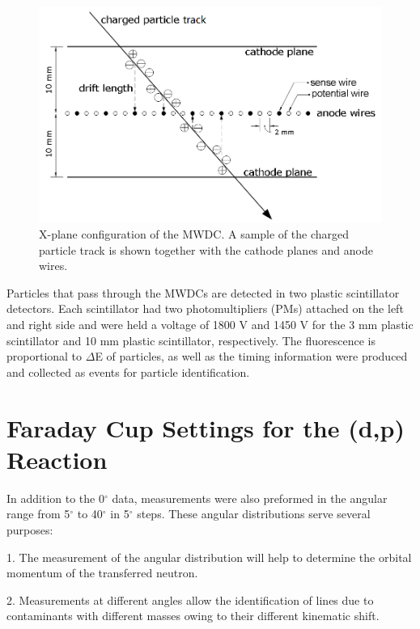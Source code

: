 \begin{figure}[tpb]
  \begin{center}
    \centerline{\includegraphics[scale=0.6]{graph/ch4/MWDCs_1}}
    \caption{X-plane configuration of the MWDC. A sample of the charged particle track is shown together with the cathode planes and anode wires.}
    \label{fig:MWDCs}
  \end{center}
\end{figure}

Particles that pass through the MWDCs are detected in two plastic scintillator detectors.
Each scintillator had two photomultipliers (PMs) attached on the left and right side  and were held a voltage of 1800 V and 1450 V for the 3 mm plastic scintillator and 10 mm plastic scintillator, respectively.  The fluorescence is proportional to $\Delta$E of particles, as well as the timing information were produced and collected as events  for particle identification.


\section{Faraday Cup Settings for the (d,p) Reaction}
In addition to the 0$^{\circ}$ data,  measurements were also preformed in the angular range from 5$^{\circ}$ to 40$^{\circ}$ in 5$^{\circ}$ steps. These angular distributions serve several purposes:

1. The measurement of the angular distribution will help to determine the orbital momentum of the transferred neutron.

2. Measurements at different angles allow the identification of lines due to contaminants with different masses owing to their different kinematic shift.

